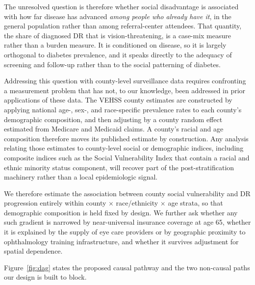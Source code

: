 \documentclass[11pt]{article}
\begin{document}
The unresolved question is therefore whether social disadvantage is associated
with how far disease has advanced \emph{among people who already have it},
in the general population rather than among referral-center attendees. That quantity,
the share of diagnosed DR that is vision-threatening, is a case-mix measure
rather than a burden measure. It is conditioned on disease, so it is largely
orthogonal to diabetes prevalence, and it speaks directly to the adequacy of
screening and follow-up rather than to the social patterning of diabetes.

Addressing this question with county-level surveillance data requires
confronting a measurement problem that has not, to our knowledge, been addressed
in prior applications of these data. The VEHSS county estimates are constructed
by applying national age-, sex-, and race-specific prevalence rates to each
county's demographic composition, and then adjusting by a county random effect
estimated from Medicare and Medicaid claims.\citep{lundeen2023} A county's
racial and age composition therefore moves its published estimate by
construction. Any analysis relating those estimates to county-level social or
demographic indices, including composite indices such as the Social
Vulnerability Index that contain a racial and ethnic minority status component,
will recover part of the post-stratification machinery rather than a local
epidemiologic signal.

We therefore estimate the association between county social vulnerability and DR
progression entirely within county $\times$ race/ethnicity $\times$ age strata,
so that demographic composition is held fixed by design. We further ask whether
any such gradient is narrowed by near-universal insurance coverage at age 65,
whether it is explained by the supply of eye care providers or by geographic
proximity to ophthalmology training infrastructure, and whether it survives
adjustment for spatial dependence.

Figure~\ref{fig:dag} states the proposed causal pathway and the two
non-causal paths our design is built to block.
\end{document}
